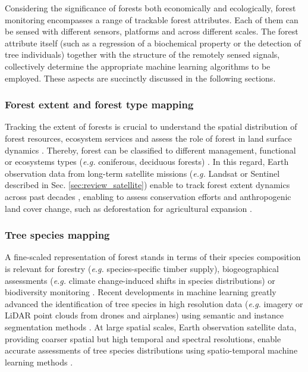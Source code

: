 \documentclass{CUP-JNL-DTM}%
\theoremstyle{definition}
\numberwithin{equation}{section}
\begin{document}
Considering the significance of forests both economically and ecologically, forest monitoring encompasses a range of trackable forest attributes. 
Each of them can be sensed with different sensors, platforms and across different scales.  
The forest attribute itself (such as a regression of a biochemical property or the detection of tree individuals) together with the structure of the remotely sensed signals, %
collectively determine the appropriate machine learning algorithms to be employed.
These aspects are succinctly discussed in the following sections. 

\subsubsection{Forest extent and forest type mapping} 
\label{sec:topic_forest_map}
Tracking the extent of forests is crucial to understand the spatial distribution of forest resources, ecosystem services and assess the role of forest in land surface dynamics \cite{keenan_dynamics_2015}. Thereby, forest can be classified to different management, functional or ecosystems types (\textit{e.g.} coniferous, deciduous forests) \cite{zhang_glc_fcs30_2021, buchhorn_copernicus_2020}. In this regard, Earth observation data from long-term satellite missions (\textit{e.g.} Landsat or Sentinel described in Sec. \ref{sec:review_satellite}) enable to track forest extent dynamics across past decades \citep{hansen_high-resolution_2013}, enabling to assess conservation efforts and anthropogenic land cover change, such as deforestation for agricultural expansion \cite{curtis_classifying_2018}. 

\subsubsection{Tree species mapping} 
\label{sec:topic_species}
A fine-scaled representation of forest stands in terms of their species composition is relevant for forestry (\textit{e.g.} species-specific timber supply), biogeographical assessments (\textit{e.g.} climate change-induced shifts in species distributions) or biodiversity monitoring \citep{fassnacht_review_2016, wang_remote_2019, cavender-bares_remote_2020}. Recent developments in machine learning greatly advanced the identification of tree species in high resolution data (\textit{e.g.} imagery or LiDAR point clouds from drones and airplanes) using semantic and instance segmentation methods \citep{cloutier_influence_2023, schiefer_mapping_2020, li_ace_2022}. At large spatial scales, Earth observation satellite data, providing coarser spatial but high temporal and spectral resolutions, enable accurate assessments of tree species distributions using spatio-temporal machine learning methods \citep{ienco_combining_2019, bolyn_mapping_2022}.
\end{document}
